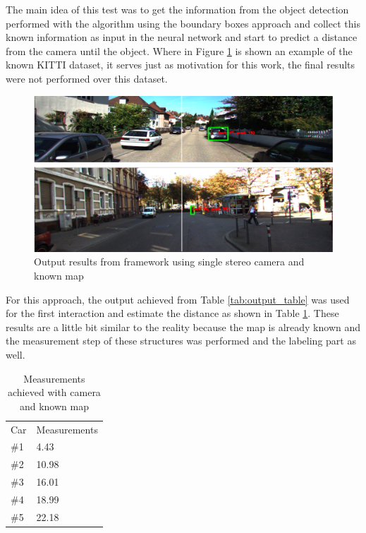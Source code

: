 The main idea of this test was to get the information from the object detection performed with the algorithm using the boundary boxes approach and collect this known information as input in the neural network and start to predict a distance from the camera until the object. Where in Figure \ref{fig:output} is shown an example of the known KITTI dataset, it serves just as motivation for this work, the final results were not performed over this dataset. 

\begin{figure}[H]
\centering
\includegraphics[width=\textwidth]{imagens/ouput.png}
\caption{Output results from framework using single stereo camera and known map}
\label{fig:output}
\end{figure}

For this approach, the output achieved from Table \ref{tab:output_table} was used for the first interaction and estimate the distance as shown in Table \ref{tab:output_2}. These results are a little bit similar to the reality because the map is already known and the measurement step of these structures was performed and the labeling part as well.

\begin{table}[H]
\centering
\caption{Measurements achieved with camera and known map}
\begin{tabular}{l|l} 
\toprule
Car &  Measurements      \\
\#1   & 4.43        \\
\#2   & 10.98       \\
\#3   & 16.01       \\
\#4   & 18.99       \\
\#5   & 22.18       \\
\bottomrule
\end{tabular}
\label{tab:output_2}
\end{table} 


